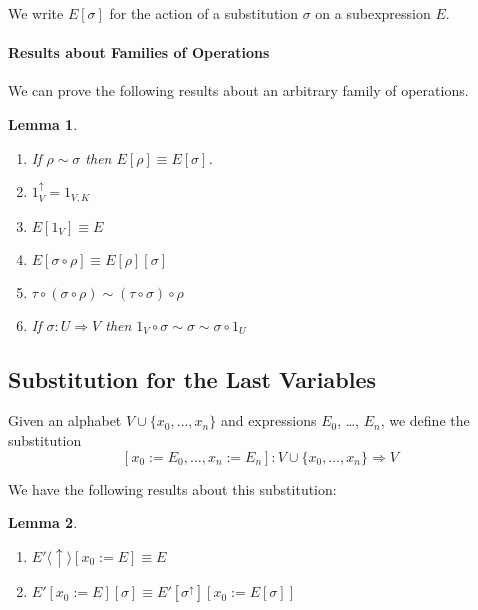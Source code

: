 \documentclass{article}
\newtheorem{lm}{Lemma}[section]
\theoremstyle{definition}
\begin{document}

We write $E [ \sigma ]$ for the action of a substitution $\sigma$ on a subexpression $E$.

\paragraph{Results about Families of Operations}

We can prove the following results about an arbitrary family of operations.

\begin{lm}
 \begin{enumerate}
  \item If $\rho \sim \sigma$ then $E [ \rho ] \equiv E [ \sigma ]$.
  \item  $1_V^\uparrow = 1_{V, K}$
  \item $E [ 1_V ] \equiv E$
  \item $E [ \sigma \circ \rho ] \equiv E [ \rho ] [ \sigma ]$
  \item $\tau \circ (\sigma \circ \rho) \sim (\tau \circ \sigma) \circ \rho$
  \item If $\sigma : U \Rightarrow V$ then $1_V \circ \sigma \sim \sigma \sim \sigma \circ 1_U$
 \end{enumerate}
\end{lm}

\subsection{Substitution for the Last Variables}

Given an alphabet $V \cup \{ x_0, \ldots, x_n\}$ and expressions $E_0$, \ldots, $E_n$, we define the substitution
\[ [x_0 := E_0, \ldots, x_n := E_n] : V \cup \{ x_0, \ldots, x_n \} \Rightarrow V \]


We have the following results about this substitution:
\begin{lm}
 \begin{enumerate}
  \item $E' \langle \uparrow \rangle [ x_0 := E ] \equiv E$
  \item $E' [ x_0 := E ] [ \sigma ] \equiv E' [ \sigma^\uparrow ] [ x_0:= E [ \sigma ] ]$
 \end{enumerate}
\end{lm}
\end{document}
